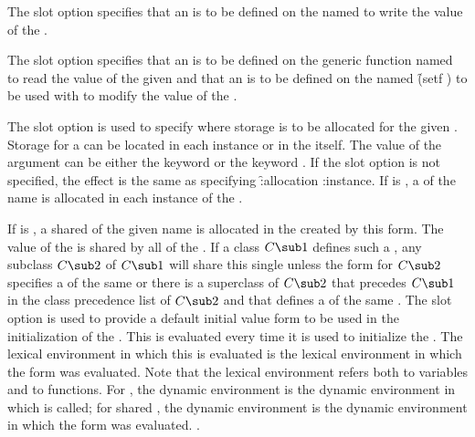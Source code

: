 \itemitem{\bull} 
The  slot option specifies that an  is
to be defined on the  named 
to write the value of the .
 
\itemitem{\bull} 
The  slot option specifies that an 
is to be defined on the generic function named 
to read the value of the given 
and that an  is to be defined on the 
 named \f{(setf )} to be
used with  to modify the value of the .
 
\itemitem{\bull} 
The  slot option is used to specify where storage is
to be allocated for the given .  Storage for a 
 can be located
in each instance or in the   itself.
The value of the  argument can be 
either the keyword 
or the keyword .    If the 
slot option is not specified, the effect is the same as specifying
\f{:allocation :instance}.
\beginlist 
\itemitem{--}                   
If  is , a  of
the name  is allocated in each instance of the 
.
 
\itemitem{--}                   
If  is , a shared 
 of the given                                      
name is allocated in the   created by this 
form.  The value of the  is shared by all 
 of the .
If a class $C\sub1$ defines such a , any 
subclass $C\sub2$ of
$C\sub1$ will share this single  unless the  form
for $C\sub2$ specifies a  of the same  or there is a
superclass of $C\sub2$ that precedes $C\sub1$ in the class precedence
list of $C\sub2$ and that defines a  of the same .
\endlist              
\itemitem{\bull} The  slot option is used to provide a default
initial value form to be used in the initialization of the .  This
 is evaluated every time it is used to initialize the 
.  The
lexical environment in which this  is evaluated is the lexical
environment in which the  form was evaluated.
Note that the lexical environment refers both to variables and to
functions.  For , the dynamic environment is the dynamic
environment in which  is called; for shared
, the dynamic environment is the dynamic environment in which the
 form was evaluated.  
\Seesection\ObjectCreationAndInit.
 
